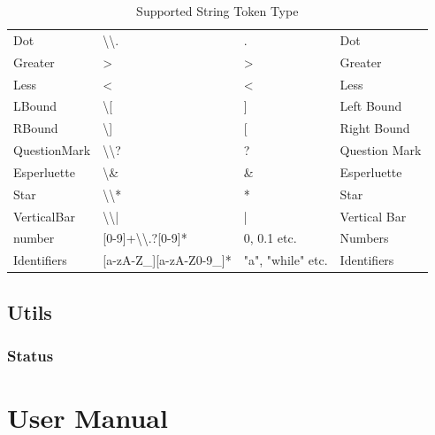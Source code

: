 \documentclass{article}
\begin{document}
\begin{table}[]
\begin{tabular}{l|lll}
                    Dot          & \textbackslash{}\textbackslash{}.                      & .                 & Dot            \\
                    Greater      & \textgreater{}                                         & \textgreater{}    & Greater        \\
                    Less         & \textless{}                                            & \textless{}       & Less           \\
                    LBound       & \textbackslash{}[                                     & {]}               & Left Bound     \\
                    RBound       & \textbackslash{}]                                     & {[}               & Right Bound    \\
                    QuestionMark & \textbackslash{}\textbackslash{}?                      & ?                 & Question Mark  \\
                    Esperluette  & \textbackslash{}\&                                     & \&                & Esperluette    \\
                    Star         & \textbackslash{}\textbackslash{}*                      & *                 & Star           \\
                    VerticalBar  & \textbackslash{}\textbackslash{}|                      & |                 & Vertical Bar   \\
                    number       & {[}0-9{]}+\textbackslash{}\textbackslash{}.?{[}0-9{]}* & 0, 0.1 etc.       & Numbers        \\
                    Identifiers  & {[}a-zA-Z\_{]}{[}a-zA-Z0-9\_{]}*                       & "a", "while" etc. & Identifiers    \\ \hline
                \end{tabular}
                \caption{Supported String Token Type}
                \label{table:supported_lexical_token_list}
           \end{table}
    \subsection{Utils}
        \subsubsection{Status }
\section{User Manual}

\printindex
\end{document}
